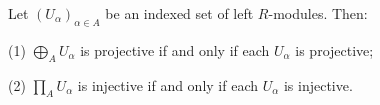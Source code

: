 Let $(U_\alpha)_{\alpha \in A}$ be an indexed set of left $R$-modules. Then:

(1) $\bigoplus_A U_\alpha$ is projective if and only if each $U_\alpha$ is projective;

(2) $\prod_A U_\alpha$ is injective if and only if each $U_\alpha$ is injective.

